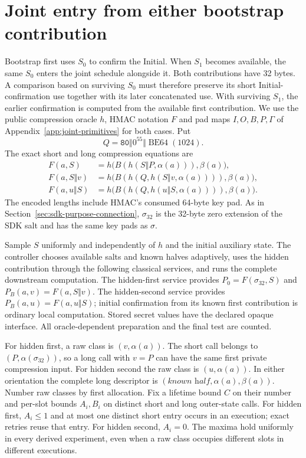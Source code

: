 \section{Joint entry from either bootstrap contribution}
\label{app:bootstrap-entry}

Bootstrap first uses $S_0$ to confirm the Initial. When $S_1$
becomes available, the same $S_0$ enters the joint schedule alongside
it. Both contributions have 32 bytes. A comparison based on surviving
$S_0$ must therefore preserve its short Initial-confirmation use together
with its later concatenated use. With surviving $S_1$, the earlier
confirmation is computed from the available first contribution. We use the public
compression oracle $h$, HMAC notation $F$ and pad maps $I,O,B,P,\Gamma$
of Appendix~\ref{app:joint-primitives} for both cases. Put
\[
 Q=\mathtt{80}\Vert0^{55}\Vert\operatorname{BE64}(1024).
\]
The exact short and long compression equations are
\begin{align}
 F(a,S)&=h\bigl(B(h(S\Vert P,\alpha(a))),\beta(a)\bigr),\nonumber\\
 F(a,S\Vert v)&=h\bigl(B(h(Q,h(S\Vert v,\alpha(a)))),\beta(a)\bigr),
 \label{eq:bootstrap-compression}\\
 F(a,u\Vert S)&=h\bigl(B(h(Q,h(u\Vert S,\alpha(a)))),\beta(a)\bigr).
 \nonumber
\end{align}
The encoded lengths include HMAC's consumed 64-byte key pad. As in
Section~\ref{sec:sdk-purpose-connection}, $\sigma_{32}$ is the 32-byte
zero extension of the SDK salt and has the same key pads as $\sigma$.

Sample $S$ uniformly and independently of $h$ and the initial auxiliary
state. The controller chooses available salts and known halves adaptively,
uses the hidden contribution through the following classical services,
and runs the complete downstream computation. The hidden-first service
provides $P_0=F(\sigma_{32},S)$ and $P_B(a,v)=F(a,S\Vert v)$.
The hidden-second service provides $P_B(a,u)=F(a,u\Vert S)$;
initial confirmation from its known first contribution is ordinary local
computation. Stored secret values have the declared opaque interface.
All oracle-dependent preparation and the final test are counted.

For hidden first, a raw class is $(v,\alpha(a))$. The short call belongs
to $(P,\alpha(\sigma_{32}))$, so a long call with $v=P$ can have the
same first private compression input. For hidden second the raw class is
$(u,\alpha(a))$. In either orientation the complete long descriptor is
$(\textit{known half},\alpha(a),\beta(a))$.
Number raw classes by first allocation. Fix a lifetime bound $C$ on
their number and per-slot bounds $A_i,B_i$ on distinct short and long
outer-state calls. For hidden first, $A_i\le1$ and at most one distinct
short entry occurs in an execution; exact retries reuse that entry.
For hidden second, $A_i=0$. The maxima
hold uniformly in every derived experiment, even when a raw class
occupies different slots in different executions.

